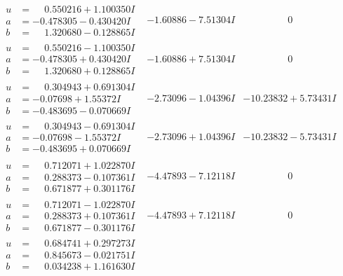 \documentclass[1p]{elsarticle_modified}
\theoremstyle{definition}
\begin{document}
$$\begin{array}{c|c|c}
\begin{aligned}
u &= \phantom{-}0.550216 + 1.100350 I \\
a &= -0.478305 - 0.430420 I \\
b &= \phantom{-}1.320680 - 0.128865 I\end{aligned}
 & -1.60886 - 7.51304 I & \phantom{-0.000000 } 0 \\ \hline\begin{aligned}
u &= \phantom{-}0.550216 - 1.100350 I \\
a &= -0.478305 + 0.430420 I \\
b &= \phantom{-}1.320680 + 0.128865 I\end{aligned}
 & -1.60886 + 7.51304 I & \phantom{-0.000000 } 0 \\ \hline\begin{aligned}
u &= \phantom{-}0.304943 + 0.691304 I \\
a &= -0.07698 + 1.55372 I \\
b &= -0.483695 - 0.070669 I\end{aligned}
 & -2.73096 - 1.04396 I & -10.23832 + 5.73431 I \\ \hline\begin{aligned}
u &= \phantom{-}0.304943 - 0.691304 I \\
a &= -0.07698 - 1.55372 I \\
b &= -0.483695 + 0.070669 I\end{aligned}
 & -2.73096 + 1.04396 I & -10.23832 - 5.73431 I \\ \hline\begin{aligned}
u &= \phantom{-}0.712071 + 1.022870 I \\
a &= \phantom{-}0.288373 - 0.107361 I \\
b &= \phantom{-}0.671877 + 0.301176 I\end{aligned}
 & -4.47893 - 7.12118 I & \phantom{-0.000000 } 0 \\ \hline\begin{aligned}
u &= \phantom{-}0.712071 - 1.022870 I \\
a &= \phantom{-}0.288373 + 0.107361 I \\
b &= \phantom{-}0.671877 - 0.301176 I\end{aligned}
 & -4.47893 + 7.12118 I & \phantom{-0.000000 } 0 \\ \hline\begin{aligned}
u &= \phantom{-}0.684741 + 0.297273 I \\
a &= \phantom{-}0.845673 - 0.021751 I \\
b &= \phantom{-}0.034238 + 1.161630 I\end{aligned}

\end{array}$$
\end{document}
